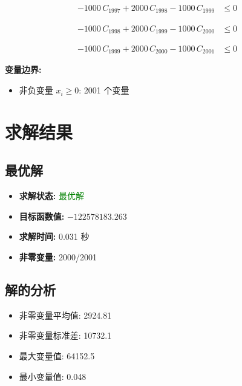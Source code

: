 \documentclass[a4paper,11pt]{article}
\begin{document}
\begin{align}
-1000\,C_{1997} + 2000\,C_{1998} - 1000\,C_{1999} &\leq 0 \nonumber
\end{align}

\begin{align}
-1000\,C_{1998} + 2000\,C_{1999} - 1000\,C_{2000} &\leq 0 \nonumber
\end{align}

\begin{align}
-1000\,C_{1999} + 2000\,C_{2000} - 1000\,C_{2001} &\leq 0 \nonumber
\end{align}

\textbf{变量边界:}
\begin{itemize}
\item 非负变量 $x_i \geq 0$: 2001 个变量
\end{itemize}

\section{求解结果}

\subsection{最优解}
\begin{itemize}
\item \textbf{求解状态:} \textcolor{green}{最优解}
\item \textbf{目标函数值:} $-122578183.263$
\item \textbf{求解时间:} 0.031 秒
\item \textbf{非零变量:} 2000/2001
\end{itemize}

\subsection{解的分析}
\begin{itemize}
\item 非零变量平均值: 2924.81
\item 非零变量标准差: 10732.1
\item 最大变量值: 64152.5
\item 最小变量值: 0.048
\end{itemize}
\end{document}
